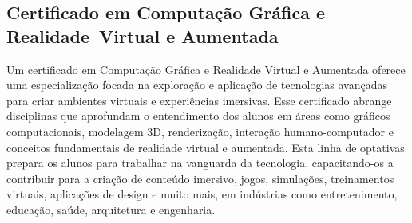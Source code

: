 \subsection{Certificado em Computação Gráfica e Realidade\ \mbox{Virtual} e Aumentada}

Um certificado em Computação Gráfica e Realidade Virtual e Aumentada oferece uma especialização focada na exploração e aplicação de tecnologias avançadas para criar ambientes virtuais e experiências imersivas. Esse certificado abrange disciplinas que aprofundam o entendimento dos alunos em áreas como gráficos computacionais, modelagem 3D, renderização, interação humano-computador e conceitos fundamentais de realidade virtual e aumentada. Esta linha de optativas prepara os alunos para trabalhar na vanguarda da tecnologia, capacitando-os a contribuir para a criação de conteúdo imersivo, jogos, simulações, treinamentos virtuais, aplicações de design e muito mais, em indústrias como entretenimento, educação, saúde, arquitetura e engenharia. 


